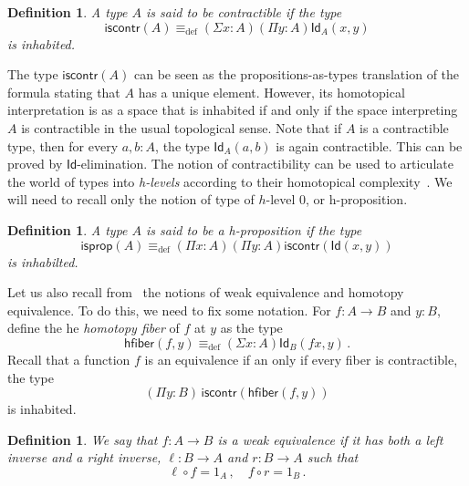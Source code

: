 \documentclass[10pt,a4paper,oneside,reqno]{amsart}
\numberwithin{equation}{section}
\theoremstyle{mythm}
\theoremstyle{mydef}
\newtheorem{definition}[theorem]{Definition}
\theoremstyle{myrmk}
\newcommand{\ie}{\text{i.e.\ }}
\newcommand{\deq}{\equiv}
\newcommand{\defeq}{\deq_{\mathrm{def}}}
\newcommand{\co}{\colon}
\newcommand{\iscontr}{\mathsf{iscontr}}
\newcommand{\isprop}{\mathsf{isprop}}
\newcommand{\hfiber}{\mathsf{hfiber}}
\newcommand{\Id}{\mathsf{Id}}
\newcommand{\id}[1]{\Id_{#1}}
\begin{document}
\begin{definition}  A type $A$ is said to be \emph{contractible} if the  type 
 \begin{equation}
 \label{eq:contractible}
\iscontr(A) \defeq (\Sigma x:A)(\Pi y:A)\id{A}(x,y)
\end{equation}
is inhabited.
\end{definition} 

The type $\iscontr(A)$ can be seen as the propositions-as-types translation
of the formula stating that $A$ has a unique element. However, its homotopical interpretation 
is as a space that is inhabited if and only if the space interpreting $A$ is contractible in the usual
topological sense. Note that if $A$ is a contractible type, then for every $a, b : A$, the type $\id{A}(a,b)$ is again contractible. 
This can be proved  by $\Id$-elimination. The notion of contractibility can be used to articulate the world of types  into \emph{h-levels} according to their
homotopical complexity~\cite{VoevodskyV:unifc}. We will need to recall only the notion of type of $h$-level 0, or h-proposition.

\begin{definition} A type $A$ is said to be a \emph{h-proposition} if the type
\[
\isprop(A) \defeq (\Pi x : A)(\Pi y : A) \iscontr( \Id(x,y)) 
\]
is inhabilted.
\end{definition}


Let us also recall from~\cite{VoevodskyV:unifc} the notions of weak equivalence and homotopy equivalence. To do this, we need to fix some notation. For $f : A \rightarrow B$ and $y : B$, define the he \emph{homotopy fiber} of $f$ at $y$ as the type
\[
 \hfiber(f,y) \defeq (\Sigma x : A) \id{B}(f x, y) \, .
\]
Recall that a function $f$ is an equivalence if an only if every fiber is contractible, \ie the type
\[
 (\Pi y : B) \,  \iscontr(\hfiber(f,y)) 
\]
is inhabited. 


\begin{definition} \label{thm:weq}  We say that $f : A \rightarrow B$ is a weak equivalence if it has both a left inverse and a right inverse, \ie
$\ell \co B \to A$ and $r \co B \to A$ such that 
\[
 \ell \circ f = 1_A \, ,  \quad  f \circ r = 1_B  \, .
 \]
 \end{definition}
 
\end{document}
